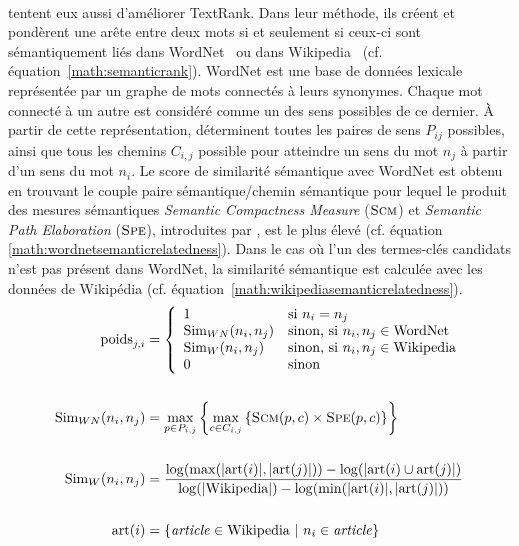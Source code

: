         ~\\ tentent eux aussi d'améliorer
        TextRank. Dans leur méthode, ils créent et pondèrent une arête entre
        deux mots si et seulement si ceux-ci sont sémantiquement liés dans
        WordNet~\cite{miller1995wordnet} ou dans
        Wikipedia~\cite{milne2008wikipediasemanticrelatedness} (cf.
        équation~\ref{math:semanticrank}). WordNet est une base de données
        lexicale représentée par un graphe de mots connectés à leurs synonymes.
        Chaque mot connecté à un autre est considéré comme un des sens possibles
        de ce dernier. À partir de cette représentation,
         déterminent toutes les paires de
        sens $P_{ij}$ possibles, ainsi que tous les chemins $C_{i, j}$ possible
        pour atteindre un sens du mot $n_j$ à partir d'un sens du mot $n_i$. Le
        score de similarité sémantique avec WordNet est obtenu en trouvant le
        couple paire sémantique/chemin sémantique pour lequel le produit des
        mesures sémantiques \textit{Semantic Compactness Measure}
        ($\textsc{Scm}$) et \textit{Semantic Path Elaboration} ($\textsc{Spe}$),
        introduites par , est le plus
        élevé (cf. équation \ref{math:wordnetsemanticrelatedness}). Dans le cas
        où l'un des termes-clés candidats n'est pas présent dans WordNet, la
        similarité sémantique est calculée avec les données de Wikipédia (cf.
        équation~\ref{math:wikipediasemanticrelatedness}).
        \begin{align}
          \text{poids}_{j, i} &= \left\{\begin{array}{ll}
            1 & \text{si $n_i = n_j$}\\
            \text{Sim}_{WN}(n_i, n_j) & \text{sinon, si $n_i, n_j \in \text{WordNet}$}\\
             \text{Sim}_{W}(n_i, n_j) &  \text{sinon, si $n_i, n_j \in \text{Wikipedia}$}\\
            0 & \text{sinon}
          \end{array}\right. \label{math:semanticrank}\\
          \notag\\
          \text{Sim}_{WN}(n_i, n_j) &= \max_{p \in P_{i, j}}\left\{\max_{c \in C_{i, j}}\left\{\textsc{Scm}(p, c) \times \textsc{Spe}(p, c)\right\}\right\} \label{math:wordnetsemanticrelatedness}\\
          \notag\\
          \text{Sim}_{W}(n_i, n_j) &= \frac{\log(\max(|\text{art}(i)|, |\text{art}(j)|)) - \log(|\text{art}(i) \cup \text{art}(j)|)}{\log(|\text{Wikipedia}|) - \log(\min(|\text{art}(i)|, |\text{art}(j)|))} \label{math:wikipediasemanticrelatedness}\\
          \notag\\
          \text{art}(i) &= \left\{\text{\textit{article}} \in \text{Wikipedia}\ |\ n_i \in \text{\textit{article}}\right\} \notag
        \end{align}

